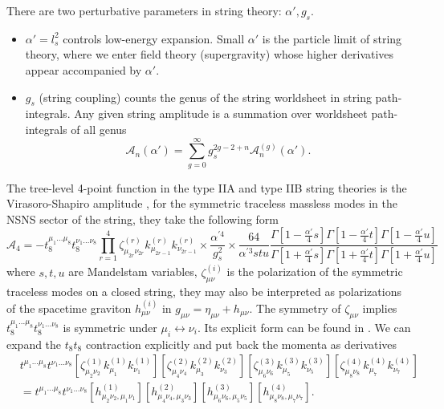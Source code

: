 There are two perturbative parameters in string theory: $\alpha',g_s$.
\begin{itemize}
    \item $\alpha'=l_s^2$ controls low-energy expansion. Small $\alpha'$ is the particle limit of string theory, where we enter field theory (supergravity) whose higher derivatives appear accompanied by $\alpha'$.
    \item $g_s$ (string coupling) counts the genus of the string worldsheet in string path-integrals. Any given string amplitude is a summation over worldsheet path-integrals of all genus
    \begin{equation}
        \mathcal A_n(\alpha') = \sum_{g=0}^\infty g_s^{2g-2+n} \mathcal A_n^{(g)}(\alpha').
    \end{equation}
\end{itemize}
The tree-level 4-point function in the type IIA and type IIB string theories is the Virasoro-Shapiro amplitude \cite{Green:2012oqa}, for the symmetric traceless massless modes in the NSNS sector of the string, they take the following form \cite{Green:1999pv}
\begin{equation}
\mathcal A_4
=-t_8^{\mu_1...\mu_8}t_8^{\nu_1...\nu_8}
\prod_{r=1}^4\zeta^{(r)}_{\mu_{2r}\nu_{2r}}k^{(r)}_{\mu_{2r-1}}k^{(r)}_{\nu_{2r-1}}
\times \frac{\alpha^{\prime 4}}{g_s^2}
\times\frac{64}{\alpha^{\prime 3}stu}
\frac{\Gamma[1-\tfrac{\alpha'}{4}s]\Gamma[1-\tfrac{\alpha'}{4}t]\Gamma[1-\tfrac{\alpha'}{4}u]}{\Gamma[1+\tfrac{\alpha'}{4}s]\Gamma[1+\tfrac{\alpha'}{4}t]\Gamma[1+\tfrac{\alpha'}{4}u]}
\end{equation}
where $s,t,u$ are Mandelstam variables, $\zeta^{(i)}_{\mu\nu}$ is the polarization of the symmetric traceless modes on a closed string, they may also be interpreted as polarizations of the spacetime graviton $h^{(i)}_{\mu\nu}$ in $g_{\mu\nu}=\eta_{\mu\nu} + h_{\mu\nu}$. 
The symmetry of $\zeta_{\mu\nu}$ implies $t_8^{\mu_1...\mu_8}t_8^{\nu_1...\nu_8}$ is symmetric under $\mu_i\leftrightarrow\nu_i$.
Its explicit form can be found in \cite{Schwarz:1982jn,Liu:2025uqu}.
We can expand the $t_8t_8$ contraction explicitly and put back the momenta as derivatives
\begin{equation}
\begin{aligned}
&t^{\mu_1...\mu_8}t^{\nu_1...\nu_8}
[\zeta^{(1)}_{\mu_2\nu_2}k^{(1)}_{\mu_1}k^{(1)}_{\nu_1}]
[\zeta^{(2)}_{\mu_4\nu_4}k^{(2)}_{\mu_3}k^{(2)}_{\nu_3}]
[\zeta^{(3)}_{\mu_6\nu_6}k^{(3)}_{\mu_5}k^{(3)}_{\nu_5}]
[\zeta^{(4)}_{\mu_8\nu_8}k^{(4)}_{\mu_7}k^{(4)}_{\nu_7}]\\
&=t^{\mu_1...\mu_8}t^{\nu_1...\nu_8}
[h^{(1)}_{\mu_2\nu_2,\mu_1\nu_1}]
[h^{(2)}_{\mu_4\nu_4,\mu_3\nu_3}]
[h^{(3)}_{\mu_6\nu_6,\mu_5\nu_5}]
[h^{(4)}_{\mu_8\nu_8,\mu_7\nu_7}].
\end{aligned}
\end{equation}
